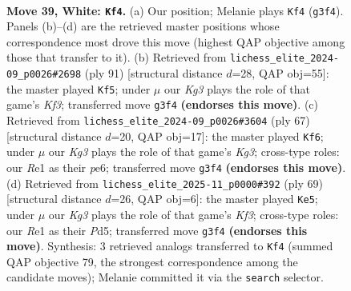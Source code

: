 \documentclass[11pt]{article}
\begin{document}
\clearpage

\begin{figure}[p]\centering
\begin{subfigure}{0.46\textwidth}\centering
\resizebox{\linewidth}{!}{%
\newchessgame
\chessboard[
  setfen={1r6/1p3p1k/p3p3/8/P3P3/5PKP/1R5P/4R3 w - - 7 39},
  showmover=false,
  pgfstyle=straightmove, color=movearrow, markmove={g3-f4}
]}
\caption{}
\end{subfigure}\hfill
\begin{subfigure}{0.46\textwidth}\centering
\resizebox{\linewidth}{!}{%
\newchessgame
\chessboard[
  setfen={R7/P4p2/5kp1/4p1p1/8/5P1P/r5P1/4K3 b - - 3 46},
  showmover=false,
  pgfstyle=straightmove, color=movearrow, markmove={f6-f5}
]}
\caption{}
\end{subfigure}
\\[4pt]
\begin{subfigure}{0.46\textwidth}\centering
\resizebox{\linewidth}{!}{%
\newchessgame
\chessboard[
  setfen={8/6p1/2p1P1kp/p5p1/P7/7P/2r3P1/R4K2 b - - 0 34},
  showmover=false,
  pgfstyle=straightmove, color=movearrow, markmove={g6-f6}
]}
\caption{}
\end{subfigure}\hfill
\begin{subfigure}{0.46\textwidth}\centering
\resizebox{\linewidth}{!}{%
\newchessgame
\chessboard[
  setfen={8/p4p2/1p2pk2/3p2p1/6P1/r7/P2K1P2/R7 b - - 5 35},
  showmover=false,
  pgfstyle=straightmove, color=movearrow, markmove={f6-e5}
]}
\caption{}
\end{subfigure}
\caption{\textbf{Move 39, White: \texttt{Kf4}.} (a) Our position; Melanie plays \texttt{Kf4} (\texttt{g3f4}). Panels (b)--(d) are the retrieved master positions whose correspondence most drove this move (highest QAP objective among those that transfer to it). (b) Retrieved from \texttt{lichess\_elite\_2024-09\_p0026\#2698} (ply 91) [structural distance $d$=28, QAP obj=55]: the master played \texttt{Kf5}; under $\mu$ our \emph{Kg3} plays the role of that game's \emph{Kf3}; transferred move \texttt{g3f4} \textbf{(endorses this move)}. (c) Retrieved from \texttt{lichess\_elite\_2024-09\_p0026\#3604} (ply 67) [structural distance $d$=20, QAP obj=17]: the master played \texttt{Kf6}; under $\mu$ our \emph{Kg3} plays the role of that game's \emph{Kg3}; cross-type roles: our \emph{R}e1 as their \emph{p}e6; transferred move \texttt{g3f4} \textbf{(endorses this move)}. (d) Retrieved from \texttt{lichess\_elite\_2025-11\_p0000\#392} (ply 69) [structural distance $d$=26, QAP obj=6]: the master played \texttt{Ke5}; under $\mu$ our \emph{Kg3} plays the role of that game's \emph{Kf3}; cross-type roles: our \emph{R}e1 as their \emph{P}d5; transferred move \texttt{g3f4} \textbf{(endorses this move)}. Synthesis: 3 retrieved analogs transferred to \texttt{Kf4} (summed QAP objective 79, the strongest correspondence among the candidate moves); Melanie committed it via the \texttt{search} selector.}
\label{fig:thought-m76}
\end{figure}
\end{document}
